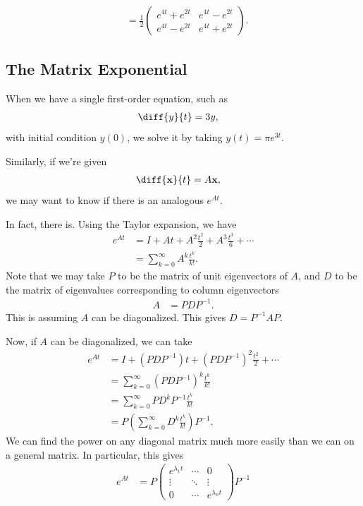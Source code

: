 \documentclass[10pt]{mypackage}
\begin{document}
\begin{example}
\begin{align*}
            &= \frac{1}{2} \begin{pmatrix}e^{4t} + e^{2t} & e^{4t} - e^{2t} \\ e^{4t} - e^{2t} & e^{4t} + e^{2t}\end{pmatrix}.
  \end{align*}
\end{example}
\subsection{The Matrix Exponential}%
\begin{example}
  When we have a single first-order equation, such as
  \begin{align*}
    \diff{y}{t} &= 3y,
  \end{align*}
  with initial condition $y(0)$, we solve it by taking $y(t) = \pi e^{3t}$.\newline

  Similarly, if we're given
  \begin{align*}
    \diff{\mathbf{x}}{t} &= A\mathbf{x},
  \end{align*}
  we may want to know if there is an analogous $e^{At}$.\newline

  In fact, there is. Using the Taylor expansion, we have
  \begin{align*}
    e^{At} &= I + At + A^2 \frac{t^2}{2} + A^{3}\frac{t^3}{6} + \cdots\\
           &= \sum_{k=0}^{\infty}A^{k}\frac{t^k}{k!}.
  \end{align*}
  Note that we may take $P$ to be the matrix of unit eigenvectors of $A$, and $D$ to be the matrix of eigenvalues corresponding to column eigenvectors
  \begin{align*}
    A &= PDP^{-1}.
  \end{align*}
  This is assuming $A$ can be diagonalized. This gives $D = P^{-1}AP$.\newline

  Now, if $A$ can be diagonalized, we can take
  \begin{align*}
    e^{At} &= I  + \left( PDP^{-1} \right)t + \left( PDP^{-1} \right)^2\frac{t^2}{2} + \cdots\\
           &= \sum_{k=0}^{\infty}\left( PDP^{-1} \right)^{k}\frac{t^k}{k!}\\
           &= \sum_{k=0}^{\infty}PD^{k}P^{-1}\frac{t^k}{k!}\\
           &= P\left( \sum_{k=0}^{\infty} D^k\frac{t^k}{k!}\right)P^{-1}.
  \end{align*}
  We can find the power on any diagonal matrix much more easily than we can on a general matrix. In particular, this gives
  \begin{align*}
    e^{At} &= P \begin{pmatrix}e^{\lambda_1 t} & \cdots & 0 \\ \vdots & \ddots & \vdots \\ 0 & \cdots & e^{\lambda_n t}\end{pmatrix}P^{-1}
  \end{align*}
\end{example}
\end{document}
